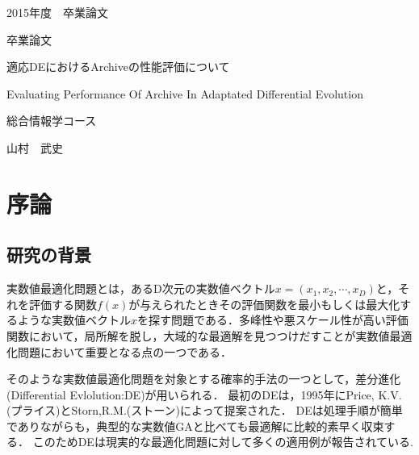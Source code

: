 \documentclass[a4paper,11pt,oneside,openany]{jsbook}
\begin{document}
\thispagestyle{empty}
2015年度　卒業論文%
\bigskip%
\LARGE%
\begin{center}
卒業論文
\end{center}
\bigskip\bigskip\bigskip\bigskip\bigskip\bigskip\bigskip %
\begin{center} %
適応DEにおけるArchiveの性能評価について
\end{center}
\large %
\begin{center}
Evaluating Performance Of Archive In Adaptated Differential Evolution
\end{center}
\bigskip\bigskip\bigskip\bigskip\bigskip\bigskip\bigskip\bigskip\bigskip\bigskip
\bigskip\bigskip\bigskip\bigskip\bigskip\bigskip\bigskip\bigskip\bigskip
\Large %
\begin{center}
総合情報学コース
\end{center}
\LARGE %
\begin{center}
山村　武史
\end{center}
\normalsize
\thispagestyle{empty}
\tableofcontents

\chapter{序論}
\section{研究の背景}
実数値最適化問題とは，あるD次元の実数値ベクトル${x} = (x_1, x_2, \cdots, x_D)$と，それを評価する関数$f(x)$が与えられたときその評価関数を最小もしくは最大化するような実数値ベクトル$x$を探す問題である．多峰性や悪スケール性が高い評価関数において，局所解を脱し，大域的な最適解を見つつけだすことが実数値最適化問題において重要となる点の一つである．

そのような実数値最適化問題を対象とする確率的手法の一つとして，差分進化(Differential Evlolution:DE)\cite{Storn}が用いられる．
最初のDEは，1995年にPrice, K.V.(プライス)とStorn,R.M.(ストーン)によって提案された．
DEは処理手順が簡単でありながらも，典型的な実数値GAと比べても最適解に比較的素早く収束する．
このためDEは現実的な最適化問題に対して多くの適用例が報告されている\cite{ExDE}.
\end{document}
